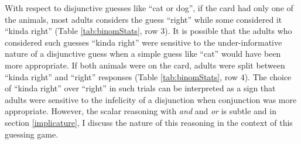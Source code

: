 \documentclass[oneside]{report}
\theoremstyle{definition}
\theoremstyle{definition}
\theoremstyle{definition}
\theoremstyle{remark}
\begin{document}
With respect to disjunctive guesses like ``cat or dog'', if the card had
only one of the animals, most adults considers the guess ``right'' while
some considered it ``kinda right'' (Table \ref{tab:binomStats}, row 3).
It is possible that the adults who considered such guesses ``kinda
right'' were sensitive to the under-informative nature of a disjunctive
guess when a simple guess like ``cat'' would have been more appropriate.
If both animals were on the card, adults were split between ``kinda
right'' and ``right'' responses (Table \ref{tab:binomStats}, row 4). The
choice of ``kinda right'' over ``right'' in such trials can be
interpreted as a sign that adults were sensitive to the infelicity of a
disjunction when conjunction was more appropriate. However, the scalar
reasoning with \emph{and} and \emph{or} is subtle and in section
\ref{implicature}, I discuss the nature of this reasoning in the context
of this guessing game.
\end{document}
